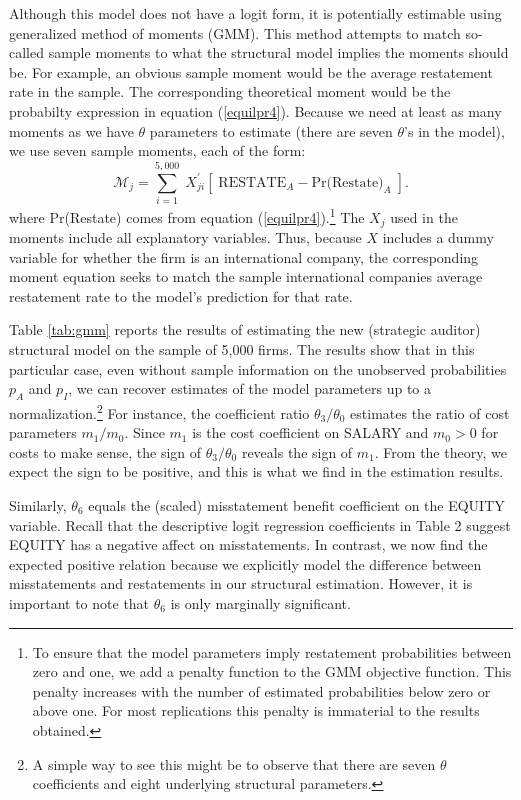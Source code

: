 Although this model does not have a logit form, it is potentially estimable using 
generalized method of moments (GMM).
This method attempts to match so-called sample moments to what the structural model implies the moments should be. 
For example, an obvious sample moment would be the average restatement rate in the sample.
The corresponding theoretical moment would be the probabilty expression in equation (\ref{equilpr4}).
Because we need at least as many moments as we have $\theta$ parameters to estimate (there are seven $\theta$'s in the model), we use seven sample moments, each of the form:
$$ \mathcal{M}_j = \sum_{i=1}^{5,000} \; X_{ji}^\prime\left[\; \mbox{RESTATE}_A - \mbox{Pr(Restate)}_A \; \right]. $$
where Pr(Restate) comes from equation (\ref{equilpr4}).\footnote{
To ensure that the model parameters imply restatement probabilities between zero and one, we add a penalty function to the GMM objective function.
This penalty increases with the number of estimated probabilities below zero or above one.
For most replications this penalty is immaterial to the results obtained.} 
The $X_j$ used in the moments include all explanatory variables. 
Thus, because $X$ includes  a dummy variable for whether the firm is an international company, the corresponding moment equation seeks to match the sample international companies average restatement rate to the model's prediction for that rate.

Table \ref{tab:gmm} reports the results of estimating the new (strategic auditor) structural model on the sample of 5,000 firms. 
The results show that in this particular case, even without sample information on the unobserved probabilities $p_A$ and $p_I$, we can recover estimates of the model parameters up to a normalization.\footnote{
A simple way to see this might be to observe that there are seven $\theta$ coefficients and eight underlying structural parameters.} 
For instance, the coefficient ratio $\theta_3/\theta_0$ estimates the ratio of cost parameters $m_1/m_0$.
Since $m_1$ is the cost coefficient on SALARY and $m_0>0$ for costs to make sense, the sign of $\theta_3/\theta_0$ reveals the sign of $m_1$.
From the theory, we expect the sign to be positive, and this is what we find in the estimation results. 

Similarly, $\theta_6$ equals the (scaled) misstatement benefit coefficient on the EQUITY variable.
Recall that the descriptive logit regression coefficients in Table 2  suggest EQUITY has a negative affect on misstatements.  In contrast, we now find the expected positive relation because we explicitly model the difference between misstatements and restatements in our structural estimation. However, it is important to note that $\theta_6$ is only marginally significant.


